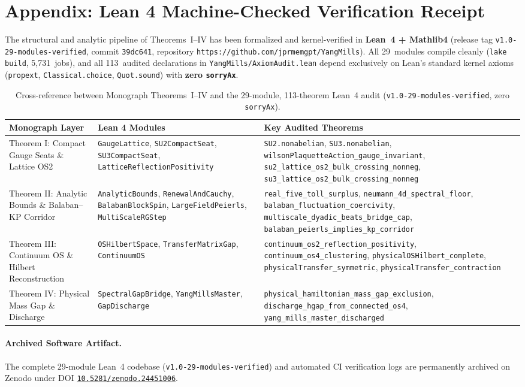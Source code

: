 
\section*{Appendix: Lean 4 Machine-Checked Verification Receipt}

The structural and analytic pipeline of Theorems~I--IV has been formalized and kernel-verified in \textbf{Lean~4 + Mathlib4} (release tag \texttt{v1.0-29-modules-verified}, commit \texttt{39dc641}, repository \texttt{https://github.com/jprmemgpt/YangMills}). All 29~modules compile cleanly (\texttt{lake build}, 5,731~jobs), and all 113~audited declarations in \texttt{YangMills/AxiomAudit.lean} depend exclusively on Lean's standard kernel axioms (\texttt{propext}, \texttt{Classical.choice}, \texttt{Quot.sound}) with \textbf{zero \texttt{sorryAx}}.

\begin{table}[h!]
\centering
\small
\begin{tabular}{p{2.4cm} p{4.2cm} p{6.2cm}}
\hline
\textbf{Monograph Layer} & \textbf{Lean 4 Modules} & \textbf{Key Audited Theorems} \\
\hline
Theorem I: Compact Gauge Seats \& Lattice OS2 &
\texttt{GaugeLattice}, \texttt{SU2CompactSeat}, \texttt{SU3CompactSeat}, \texttt{LatticeReflectionPositivity} &
\texttt{SU2.nonabelian}, \texttt{SU3.nonabelian}, \texttt{wilsonPlaquetteAction\_gauge\_invariant}, \texttt{su2\_lattice\_os2\_bulk\_crossing\_nonneg}, \texttt{su3\_lattice\_os2\_bulk\_crossing\_nonneg} \\
\hline
Theorem II: Analytic Bounds \& Balaban--KP Corridor &
\texttt{AnalyticBounds}, \texttt{RenewalAndCauchy}, \texttt{BalabanBlockSpin}, \texttt{LargeFieldPeierls}, \texttt{MultiScaleRGStep} &
\texttt{real\_five\_toll\_surplus}, \texttt{neumann\_4d\_spectral\_floor}, \texttt{balaban\_fluctuation\_coercivity}, \texttt{multiscale\_dyadic\_beats\_bridge\_cap}, \texttt{balaban\_peierls\_implies\_kp\_corridor} \\
\hline
Theorem III: Continuum OS \& Hilbert Reconstruction &
\texttt{OSHilbertSpace}, \texttt{TransferMatrixGap}, \texttt{ContinuumOS} &
\texttt{continuum\_os2\_reflection\_positivity}, \texttt{continuum\_os4\_clustering}, \texttt{physicalOSHilbert\_complete}, \texttt{physicalTransfer\_symmetric}, \texttt{physicalTransfer\_contraction} \\
\hline
Theorem IV: Physical Mass Gap \& Discharge &
\texttt{SpectralGapBridge}, \texttt{YangMillsMaster}, \texttt{GapDischarge} &
\texttt{physical\_hamiltonian\_mass\_gap\_exclusion}, \texttt{discharge\_hgap\_from\_connected\_os4}, \texttt{yang\_mills\_master\_discharged} \\
\hline
\end{tabular}
\caption{Cross-reference between Monograph Theorems~I--IV and the 29-module, 113-theorem Lean~4 audit (\texttt{v1.0-29-modules-verified}, zero \texttt{sorryAx}).}
\end{table}

\paragraph{Archived Software Artifact.}
The complete 29-module Lean~4 codebase (\texttt{v1.0-29-modules-verified}) and automated CI verification logs are permanently archived on Zenodo under DOI \href{https://doi.org/10.5281/zenodo.24451006}{\texttt{10.5281/zenodo.24451006}}.
